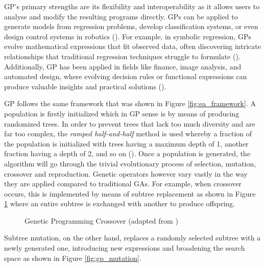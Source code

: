 \parbreak\noindent GP's primary strengths are its flexibility and interoperability as it allows users to analyse and modify the resulting programs directly. GPs can be applied to generate models from regression problems, develop classification systems, or even design control systems in robotics (\cite{o2009riccardo}). For example, in symbolic regression, GPs evolve mathematical expressions that fit observed data, often discovering intricate relationships that traditional regression techniques struggle to formulate (\cite{koza1994genetic}). Additionally, GP has been applied in fields like finance, image analysis, and automated design, where evolving decision rules or functional expressions can produce valuable insights and practical solutions (\cite{o2009riccardo}).

\parbreak\noindent GP follows the same framework that was shown in Figure \ref{fig:ea_framework}. A population is firstly initialized which in GP sense is by means of producing randomized trees. In order to prevent trees that lack too much diversity and are far too complex, the \textit{ramped half-and-half} method is used whereby a fraction of the population is initialized with trees having a maximum depth of 1, another fraction having a depth of 2, and so on (\cite{back2012handbook}). Once a population is generated, the algorithm will go through the trivial evolutionary process of selection, mutation, crossover and reproduction. Genetic operators however vary vastly in the way they are applied compared to traditional GAs. For example, when crossover occurs, this is implemented by means of subtree replacement as shown in Figure \ref{fig:gp_crossover} where an entire subtree is exchanged with another to produce offspring.

\parbreak
\begin{figure}[H] %
	\centering %
	\caption{Genetic Programming Crossover (adapted from \cite{book_introduction_to_evolutionary_computing})}
	\label{fig:gp_crossover} %
\end{figure}

\parbreak\noindent Subtree mutation, on the other hand, replaces a randomly selected subtree with a newly generated one, introducing new expressions and broadening the search space as shown in Figure \ref{fig:gp_mutation}.

